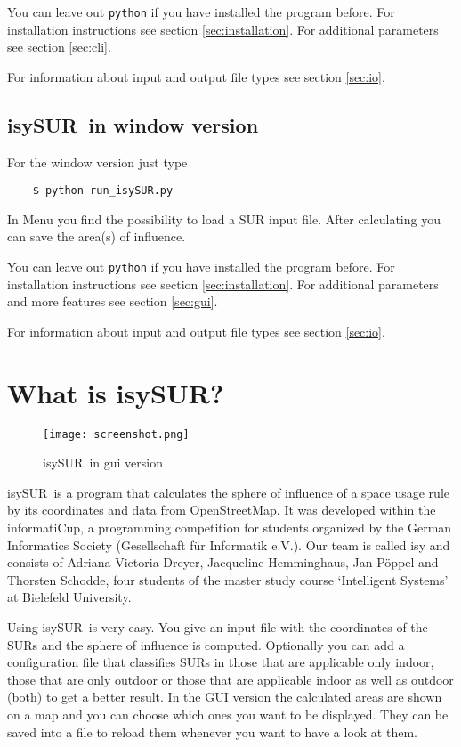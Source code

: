 \documentclass[11pt,fleqn]{book} %
\newcommand{\ProjectTitle}{isySUR}
\newcommand{\pt}{\ProjectTitle}
\begin{document}
You can leave out \texttt{python} if you have installed the program before. For installation instructions see section \ref{sec:installation}. For additional parameters see section \ref{sec:cli}.

For information about input and output file types see section \ref{sec:io}.

\subsection{\ProjectTitle\ in window version}\label{sec:QuickstartWindow}
For the window version just type
\begin{verbatim}
	$ python run_isySUR.py
\end{verbatim}
In Menu you find the possibility to load a SUR input file. After calculating you can save the area(s) of influence.

You can leave out \texttt{python} if you have installed the program before. For installation instructions see section \ref{sec:installation}. For additional parameters and more features see section \ref{sec:gui}.

For information about input and output file types see section \ref{sec:io}.

\section{What is \ProjectTitle?}\label{sec:whatFor}
\begin{figure}
\centering
\texttt{[image: screenshot.png]}
\caption{\pt\ in gui version}
\end{figure}
\pt\ is a program that calculates the sphere of influence of a space usage rule by its coordinates and data from OpenStreetMap. It was developed within the informatiCup, a programming competition for students organized by the German Informatics Society (Gesellschaft für Informatik e.V.). Our team is called isy and consists of Adriana-Victoria Dreyer, Jacqueline Hemminghaus, Jan Pöppel and Thorsten Schodde, four students of the master study course `Intelligent Systems' at Bielefeld University.

Using \pt\ is very easy. You give an input file with the coordinates of the SURs and the sphere of influence is computed. Optionally you can add a configuration file that classifies SURs in those that are applicable only indoor, those that are only outdoor or those that are applicable indoor as well as outdoor (both) to get a better result. In the GUI version the calculated areas are shown on a map and you can choose which ones you want to be displayed. They can be saved into a file to reload them whenever you want to have a look at them.
\end{document}
